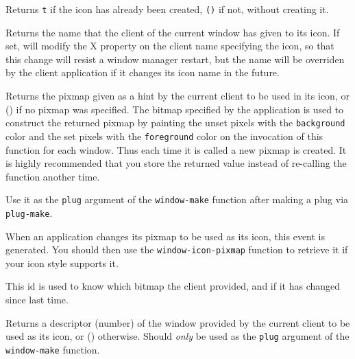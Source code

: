 Returns \verb|t| if the icon has already been created, \verb|()| if not,
without creating it.

        

Returns the name that the client of the current window has given to its
icon. If set, will modify the X property on the client name specifying the
icon, so that this change will resist a window manager restart, but the name
will be overriden by the client application if it changes its icon name in the
future. 

        

Returns the pixmap given as a hint by the current client to be used in its
icon, or () if no pixmap was specified. The bitmap specified by the
application is used to construct the returned pixmap by painting the unset
pixels with the \verb"background" color and the set pixels with the
\verb"foreground" color on the invocation of this function for each window.
Thus each time it is called a new pixmap is created. It is highly
recommended that you store the returned value instead of re-calling the
function another time.

Use it as the \verb"plug" argument of the \verb"window-make" function after
making a plug via \verb"plug-make".

        

When an application changes its pixmap to be used as its icon, this event is
generated. You should then use the \verb"window-icon-pixmap" function to
retrieve it if your icon style supports it.

        

This id is used to know which bitmap the client provided, and if it has
changed since last time.

        

Returns a descriptor (number) of the window provided by the current client
to be used as its icon, or () otherwise. Should {\em only\/} be used as the
\verb"plug" argument of the \verb"window-make" function.

